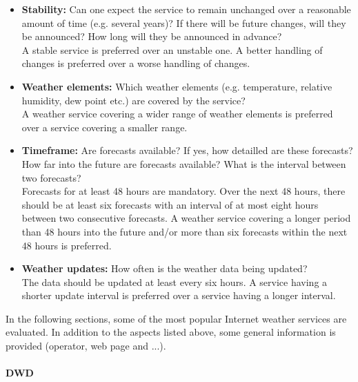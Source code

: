 \begin{itemize}
  \item \textbf{Stability:} Can one expect the service to remain unchanged over a reasonable amount of time (e.g. several years)? If there will be future changes, will they be announced? How long will they be announced in advance?\\
  A stable service is preferred over an unstable one. A better handling of changes is preferred over a worse handling of changes.
  \item \textbf{Weather elements:} Which weather elements (e.g. temperature, relative humidity, dew point etc.) are covered by the service?\\
  A weather service covering a wider range of weather elements is preferred over a service covering a smaller range.
  \item \textbf{Timeframe:} Are forecasts available? If yes, how detailled are these forecasts? How far into the future are forecasts available? What is the interval between two forecasts?\\
  Forecasts for at least 48 hours are mandatory. Over the next 48 hours, there should be at least six forecasts with an interval of at most eight hours between two consecutive forecasts. A weather service covering a longer period than 48 hours into the future and/or more than six forecasts within the next 48 hours is preferred.
  \item \textbf{Weather updates:} How often is the weather data being updated?\\
  The data should be updated at least every six hours. A service having a shorter update interval is preferred over a service having a longer interval.
\end{itemize}

In the following sections, some of the most popular Internet weather services are evaluated. In addition to the aspects listed above, some general information is provided (operator, web page and ...). %

\paragraph{DWD}

